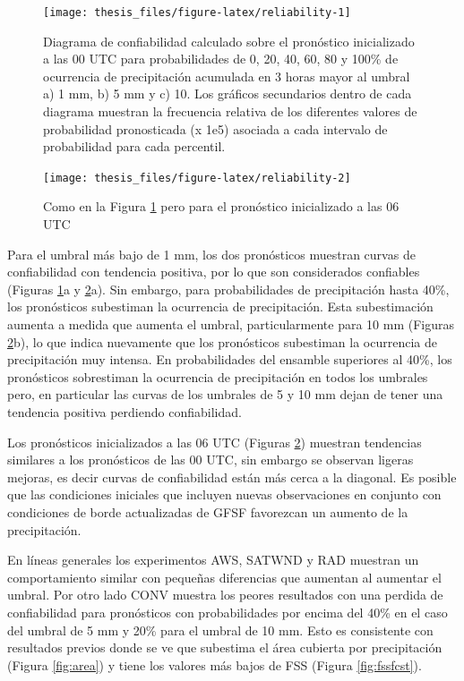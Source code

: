\documentclass[12pt,oneside,a4paper]{reedthesis}
\begin{document}
\begin{figure}

{\centering \texttt{[image: thesis\_files/figure-latex/reliability-1]} 

}

\caption{Diagrama de confiabilidad calculado sobre el pronóstico inicializado a las 00 UTC para probabilidades de 0, 20, 40, 60, 80 y 100\% de ocurrencia de precipitación acumulada en 3 horas mayor al umbral a) 1 mm, b) 5 mm y c) 10. Los gráficos secundarios dentro de cada diagrama muestran la frecuencia relativa de los diferentes valores de probabilidad pronosticada (x 1e5) asociada a cada intervalo de probabilidad para cada percentil.}\label{fig:reliability-1}
\end{figure}
\begin{figure}

{\centering \texttt{[image: thesis\_files/figure-latex/reliability-2]} 

}

\caption{Como en la Figura \ref{fig:reliability-1} pero para el pronóstico inicializado a las 06 UTC}\label{fig:reliability-2}
\end{figure}
Para el umbral más bajo de 1 mm, los dos pronósticos muestran curvas de confiabilidad con tendencia positiva, por lo que son considerados confiables (Figuras \ref{fig:reliability-1}a y \ref{fig:reliability-2}a). Sin embargo, para probabilidades de precipitación hasta 40\%, los pronósticos subestiman la ocurrencia de precipitación. Esta subestimación aumenta a medida que aumenta el umbral, particularmente para 10 mm (Figuras \ref{fig:reliability-2}b), lo que indica nuevamente que los pronósticos subestiman la ocurrencia de precipitación muy intensa. En probabilidades del ensamble superiores al 40\%, los pronósticos sobrestiman la ocurrencia de precipitación en todos los umbrales pero, en particular las curvas de los umbrales de 5 y 10 mm dejan de tener una tendencia positiva perdiendo confiabilidad.

Los pronósticos inicializados a las 06 UTC (Figuras \ref{fig:reliability-2}) muestran tendencias similares a los pronósticos de las 00 UTC, sin embargo se observan ligeras mejoras, es decir curvas de confiabilidad están más cerca a la diagonal. Es posible que las condiciones iniciales que incluyen nuevas observaciones en conjunto con condiciones de borde actualizadas de GFSF favorezcan un aumento de la precipitación.

En líneas generales los experimentos AWS, SATWND y RAD muestran un comportamiento similar con pequeñas diferencias que aumentan al aumentar el umbral. Por otro lado CONV muestra los peores resultados con una perdida de confiabilidad para pronósticos con probabilidades por encima del 40\% en el caso del umbral de 5 mm y 20\% para el umbral de 10 mm. Esto es consistente con resultados previos donde se ve que subestima el área cubierta por precipitación (Figura \ref{fig:area}) y tiene los valores más bajos de FSS (Figura \ref{fig:fssfcst}).
\end{document}

